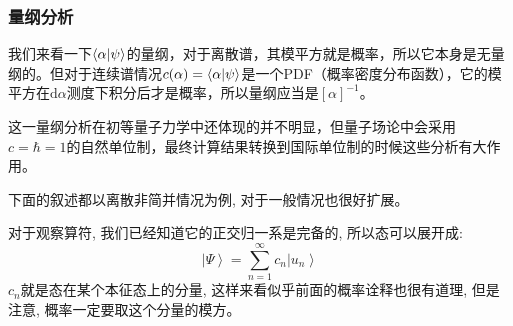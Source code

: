 \documentclass[a4paper,zihao=-4,linespread=1]{ctexrep}
\begin{document}
    \subsubsection{量纲分析}
    我们来看一下$\braket{\alpha|\psi}$的量纲，对于离散谱，其模平方就是概率，所以它本身是无量纲的。但对于连续谱情况$c(\alpha)=\braket{\alpha|\psi}$是一个PDF（概率密度分布函数），它的模平方在$\mathrm{d}\alpha$测度下积分后才是概率，所以量纲应当是$[\alpha]^{-1}$。
    
    这一量纲分析在初等量子力学中还体现的并不明显，但量子场论中会采用$c=\hbar=1$的自然单位制，最终计算结果转换到国际单位制的时候这些分析有大作用。

    下面的叙述都以离散非简并情况为例, 对于一般情况也很好扩展。
    
    对于观察算符, 我们已经知道它的正交归一系是完备的, 所以态可以展开成:
    \[\left | \Psi  \right \rangle =\sum\limits_{n=1}^{\infty } c_n\left | u_n \right \rangle \]
    $c_n$就是态在某个本征态上的分量, 这样来看似乎前面的概率诠释也很有道理, 但是注意, 概率一定要取这个分量的模方。
\end{document}

